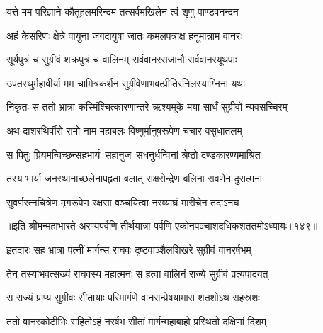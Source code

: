 
\translink{}

\storymeta



\addtocounter{shlokacount}{25}

\twolineshloka
{यत्ते मम परिज्ञाने कौतूहलमरिन्दम}
{तत्सर्वमखिलेन त्वं शृणु पाण्डवनन्दन}


\twolineshloka
{अहं केसरिणः क्षेत्रे वायुना जगदायुषा}
{जातः कमलपत्राक्ष हनूमान्नाम वानरः}


\twolineshloka
{सूर्यपुत्रं च सुग्रीवं शक्रपुत्रं च वालिनम्}
{सर्ववानरराजानौ सर्ववानरयूथपाः}


\twolineshloka
{उपतस्थुर्महावीर्या मम चामित्रकर्शन}
{सुग्रीवेणाभवत्प्रीतिरनिलस्याग्निना यथा}


\twolineshloka
{निकृतः स ततो भ्रात्रा कस्मिंश्चित्कारणान्तरे}
{ऋश्यमूके मया सार्धं सुग्रीवो न्यवसच्चिरम्}


\twolineshloka
{अथ दाशरथिर्वीरो रामो नाम महाबलः}
{विष्णुर्मानुषरूपेण चचार वसुधातलम्}


\twolineshloka
{स पितुः प्रियमन्विच्छन्सहभार्यः सहानुजः}
{सधनुर्धन्विनां श्रेष्ठो दण्डकारण्यमाश्रितः}


\twolineshloka
{तस्य भार्या जनस्थानाच्छलेनापहृता बलात्}
{राक्षसेन्द्रेण बलिना रावणेन दुरात्मना}


\twolineshloka
{सुवर्णरत्नचित्रेण मृगरूपेण रक्षसा}
{वञ्चयित्वा नरव्याघ्रं मारीचेन तदाऽनघ}

॥इति श्रीमन्महाभारते अरण्यपर्वणि तीर्थयात्रा-पर्वणि एकोनपञ्चाशदधिकशततमोऽध्यायः॥१४९॥




\twolineshloka
{हृतदारः सह भ्रात्रा पत्नीं मार्गन्स राघवः}
{दृष्टवाञ्शैलशिखरे सुग्रीवं वानरर्षभम्}


\twolineshloka
{तेन तस्याभवत्सख्यं राघवस्य महात्मनः}
{स हत्वा वालिनं राज्ये सुग्रीवं प्रत्यपादयत्}


\twolineshloka
{स राज्यं प्राप्य सुग्रीवः सीतायाः परिमार्गणे}
{वानरान्प्रेषयामास शतशोऽथ सहस्रशः}


\twolineshloka
{ततो वानरकोटीभिः सहितोऽहं नरर्षभ}
{सीतां मार्गन्महाबाहो प्रस्थितो दक्षिणां दिशम्}


